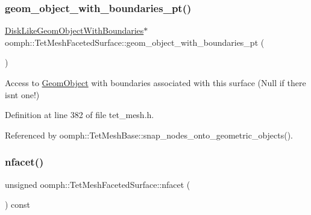 \mbox{\label{classoomph_1_1TetMeshFacetedSurface_aef8f755bcf97e239a5c4c987e9ab9bc2}} 
\subsubsection{\texorpdfstring{geom\+\_\+object\+\_\+with\+\_\+boundaries\+\_\+pt()}{geom\_object\_with\_boundaries\_pt()}}
{\footnotesize\ttfamily \hyperlink{classoomph_1_1DiskLikeGeomObjectWithBoundaries}{Disk\+Like\+Geom\+Object\+With\+Boundaries}$\ast$ oomph\+::\+Tet\+Mesh\+Faceted\+Surface\+::geom\+\_\+object\+\_\+with\+\_\+boundaries\+\_\+pt (\begin{DoxyParamCaption}{ }\end{DoxyParamCaption})\hspace{0.3cm}{\ttfamily [inline]}}



Access to \hyperlink{classoomph_1_1GeomObject}{Geom\+Object} with boundaries associated with this surface (Null if there isn\textquotesingle{}t one!) 



Definition at line 382 of file tet\+\_\+mesh.\+h.



Referenced by oomph\+::\+Tet\+Mesh\+Base\+::snap\+\_\+nodes\+\_\+onto\+\_\+geometric\+\_\+objects().

\mbox{\label{classoomph_1_1TetMeshFacetedSurface_a6036f2a5e11bea9d72f9bba9a89faec7}} 
\subsubsection{\texorpdfstring{nfacet()}{nfacet()}}
{\footnotesize\ttfamily unsigned oomph\+::\+Tet\+Mesh\+Faceted\+Surface\+::nfacet (\begin{DoxyParamCaption}{ }\end{DoxyParamCaption}) const\hspace{0.3cm}{\ttfamily [inline]}}



